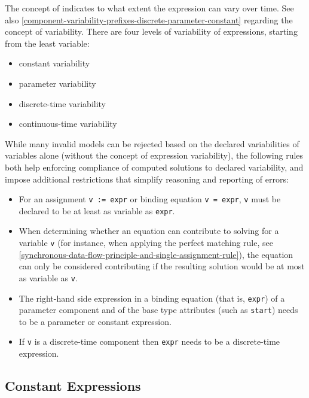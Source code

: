 The concept of  indicates to what extent the expression can vary over time.
See also \cref{component-variability-prefixes-discrete-parameter-constant} regarding the concept of variability.
There are four levels of variability of expressions, starting from the least variable:
\begin{itemize}
\item
  constant variability
\item
  parameter variability
\item
  discrete-time variability
\item
  continuous-time variability
\end{itemize}

While many invalid models can be rejected based on the declared variabilities of variables alone (without the concept of expression
variability), the following rules both help enforcing compliance of computed solutions to declared variability, and impose additional
restrictions that simplify reasoning and reporting of errors:
\begin{itemize}
\item
  For an assignment \lstinline!v := expr! or binding equation \lstinline!v = expr!, \lstinline!v! must be declared to be at least as variable as \lstinline!expr!.
\item
  When determining whether an equation can contribute to solving for a variable \lstinline!v! (for instance,
  when applying the perfect matching rule, see \cref{synchronous-data-flow-principle-and-single-assignment-rule}),
  the equation can only be considered contributing if the resulting solution would be at most as variable as \lstinline!v!.
\item
  The right-hand side expression in a binding equation (that is, \lstinline!expr!) of a parameter component and of the base type attributes
  (such as \lstinline!start!) needs to be a parameter or constant expression.
\item
  If \lstinline!v! is a discrete-time component then \lstinline!expr! needs to be a
  discrete-time expression.
\end{itemize}

\subsection{Constant Expressions}\label{constant-expressions}

